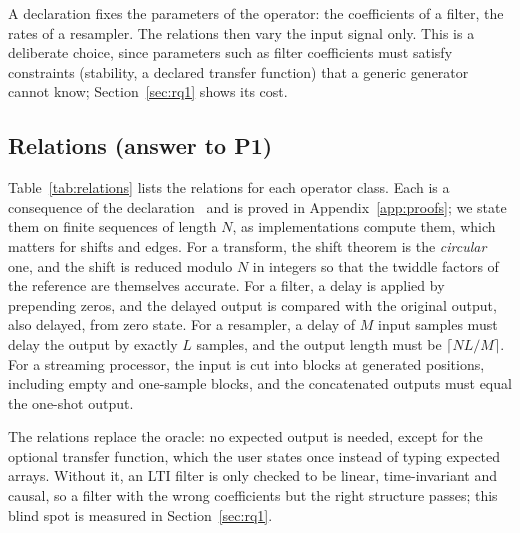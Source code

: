 \documentclass[10pt,conference]{IEEEtran}
\begin{document}
A declaration fixes the parameters of the operator: the coefficients of a
filter, the rates of a resampler. The relations then vary the input signal
only. This is a deliberate choice, since parameters such as filter
coefficients must satisfy constraints (stability, a declared transfer function)
that a generic generator cannot know; Section~\ref{sec:rq1} shows its cost.

\subsection{Relations (answer to P1)}
\label{sec:relations}
Table~\ref{tab:relations} lists the relations for each operator class. Each is
a consequence of the declaration~\cite{oppenheim2010dtsp,vaidyanathan1993multirate} and is proved in Appendix~\ref{app:proofs}; we
state them on finite sequences of length $N$, as implementations compute them,
which matters for shifts and edges. For a transform, the shift theorem is the
\emph{circular} one, and the shift is reduced modulo $N$ in integers so that the
twiddle factors of the reference are themselves accurate. For a filter, a delay
is applied by prepending zeros, and the delayed output is compared with the
original output, also delayed, from zero state. For a resampler, a delay of $M$
input samples must delay the output by exactly $L$ samples, and the output
length must be $\lceil NL/M\rceil$. For a streaming processor, the input is cut
into blocks at generated positions, including empty and one-sample blocks, and
the concatenated outputs must equal the one-shot output.

The relations replace the oracle: no expected output is needed, except for the
optional transfer function, which the user states once instead of typing
expected arrays. Without it, an LTI filter is only checked to be linear,
time-invariant and causal, so a filter with the wrong coefficients but the
right structure passes; this blind spot is measured in Section~\ref{sec:rq1}.
\end{document}
